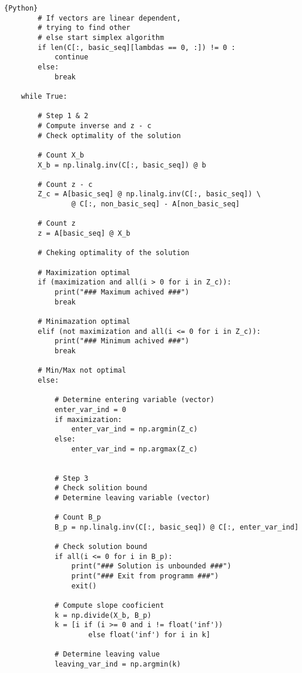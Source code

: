 \documentclass[12pt, legalpaper]{exam}
\begin{document}
\begin{lstlisting}{Python}
        # If vectors are linear dependent,
        # trying to find other
        # else start simplex algorithm 
        if len(C[:, basic_seq][lambdas == 0, :]) != 0 :
            continue
        else:
            break 
    
    while True:
        
        # Step 1 & 2
        # Compute inverse and z - c
        # Check optimality of the solution
    
        # Count X_b
        X_b = np.linalg.inv(C[:, basic_seq]) @ b
    
        # Count z - c        
        Z_c = A[basic_seq] @ np.linalg.inv(C[:, basic_seq]) \
                @ C[:, non_basic_seq] - A[non_basic_seq]
    
        # Count z
        z = A[basic_seq] @ X_b
    
        # Cheking optimality of the solution
    
        # Maximization optimal
        if (maximization and all(i > 0 for i in Z_c)):
            print("### Maximum achived ###")
            break
    
        # Minimazation optimal
        elif (not maximization and all(i <= 0 for i in Z_c)):
            print("### Minimum achived ###")
            break
            
        # Min/Max not optimal
        else:
    
            # Determine entering variable (vector)
            enter_var_ind = 0
            if maximization:
                enter_var_ind = np.argmin(Z_c)
            else: 
                enter_var_ind = np.argmax(Z_c)
    
    
            # Step 3
            # Check solition bound
            # Determine leaving variable (vector)
    
            # Count B_p
            B_p = np.linalg.inv(C[:, basic_seq]) @ C[:, enter_var_ind]
    
            # Check solution bound
            if all(i <= 0 for i in B_p):
                print("### Solution is unbounded ###")
                print("### Exit from programm ###")
                exit()
    
            # Compute slope cooficient
            k = np.divide(X_b, B_p)
            k = [i if (i >= 0 and i != float('inf')) 
                    else float('inf') for i in k]
    
            # Determine leaving value
            leaving_var_ind = np.argmin(k)
    

\end{lstlisting}
\end{document}
